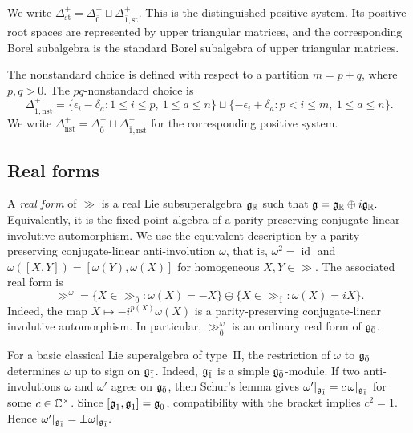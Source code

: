 We write
$
\Delta_{\mathrm{st}}^+=\Delta_{\bar0}^+\sqcup\Delta_{\bar1,\mathrm{st}}^+.
$
This is the distinguished positive system. Its positive root spaces are represented by upper triangular matrices, and the corresponding Borel subalgebra is the standard Borel subalgebra of upper triangular matrices.

The nonstandard choice is defined with respect to a partition $m=p+q$, where $p,q>0$. The $pq$-nonstandard choice is
\begin{equation}\label{eq::non_standard_positive}
\Delta_{\bar1,\mathrm{nst}}^+
=
\{\epsilon_i-\delta_a:1\leq i\leq p,\ 1\leq a\leq n\}
\sqcup
\{-\epsilon_i+\delta_a:p<i\leq m,\ 1\leq a\leq n\}.
\end{equation}
We write
$
\Delta_{\mathrm{nst}}^+=\Delta_{\bar0}^+\sqcup\Delta_{\bar1,\mathrm{nst}}^+
$
for the corresponding positive system.

\subsection{Real forms}\label{subsec::real_forms}

A \emph{real form} of $\gg$ is a real Lie subsuperalgebra ${\mathfrak{g}}_{{\mathbb R}}$ such that
$
{\mathfrak{g}}={\mathfrak{g}}_{{\mathbb R}}\oplus i{\mathfrak{g}}_{{\mathbb R}}.
$
Equivalently, it is the fixed-point algebra of a parity-preserving conjugate-linear involutive automorphism. We use the equivalent description by a parity-preserving conjugate-linear anti-involution $\omega$, that is, $\omega^2=\operatorname{id}$ and $\omega([X,Y])=[\omega(Y),\omega(X)]$ for homogeneous $X,Y\in\gg$. The associated real form is
\begin{equation}
    \gg^\omega
    =
    \{X\in\gg_{\bar0}:\omega(X)=-X\}
    \oplus
    \{X\in\gg_{\bar1}:\omega(X)=iX\}.
\end{equation}
Indeed, the map $X\mapsto-i^{p(X)}\omega(X)$ is a parity-preserving conjugate-linear involutive automorphism. In particular, $\gg^\omega_{\bar0}$ is an ordinary real form of ${\mathfrak{g}_{\bar{0}}}$.

\begin{remark}\label{rmk::pairs_conjugation}
For a basic classical Lie superalgebra of type~II, the restriction of $\omega$ to ${\mathfrak{g}_{\bar{0}}}$ determines $\omega$ up to sign on ${\mathfrak{g}_{\bar{1}}}$. Indeed, ${\mathfrak{g}_{\bar{1}}}$ is a simple ${\mathfrak{g}_{\bar{0}}}$-module. If two anti-involutions $\omega$ and $\omega'$ agree on ${\mathfrak{g}_{\bar{0}}}$, then Schur's lemma gives
$
\omega'|_{{\mathfrak{g}_{\bar{1}}}}=c\,\omega|_{{\mathfrak{g}_{\bar{1}}}}
$
for some $c\in{\mathbb C}^\times$. Since $[{\mathfrak{g}_{\bar{1}}},{\mathfrak{g}_{\bar{1}}}]={\mathfrak{g}_{\bar{0}}}$, compatibility with the bracket implies $c^2=1$. Hence
$
\omega'|_{{\mathfrak{g}_{\bar{1}}}}=\pm\omega|_{{\mathfrak{g}_{\bar{1}}}}.
$
\end{remark}

